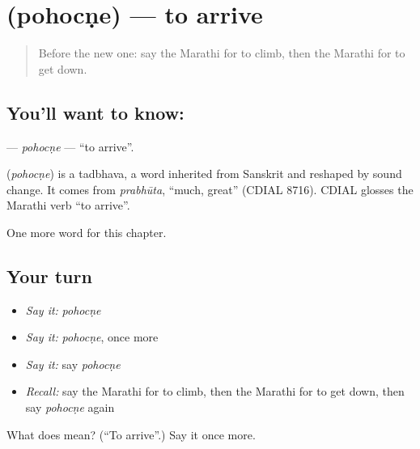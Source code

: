 \section[\texorpdfstring{\mr{पोहोचणे} (pohocṇe)}{पोहोचणे (pohocṇe)}]{ (pohocṇe) — to arrive}

\label{lesson:MR-C153-pohocne}



\begin{quote}
Before the new one: say the Marathi for to climb, then the Marathi for to get down.
\end{quote}

\subsection*{You'll want to know: }
\textbf{} — \emph{pohocṇe} — \textquotedblleft{}to arrive\textquotedblright{}.

\begin{cousinweb}
\textbf{} (\emph{pohocṇe}) is a tadbhava, a word inherited from Sanskrit and reshaped by sound change. It comes from \emph{prabhūta}, \textquotedblleft{}much, great\textquotedblright{} (CDIAL 8716). CDIAL glosses the Marathi verb \textquotedblleft{}to arrive\textquotedblright{}.
\end{cousinweb}

\begin{grammarlens}[title={What you've built}]
One more word for this chapter.
\end{grammarlens}

\subsection*{Your turn}
\begin{itemize}
\raggedright
  \item \emph{Say it:} \emph{pohocṇe}
  \item \emph{Say it:} \emph{pohocṇe}, once more
  \item \emph{Say it:} say \emph{pohocṇe}
  \item \emph{Recall:} say the Marathi for to climb, then the Marathi for to get down, then say \emph{pohocṇe} again
\end{itemize}

\begin{tcolorbox}[breakable,colback=teal!4,colframe=teal!35!black,title={Before you move on}]
What does  mean? (\textquotedblleft{}To arrive\textquotedblright{}.) Say it once more.
\end{tcolorbox}
